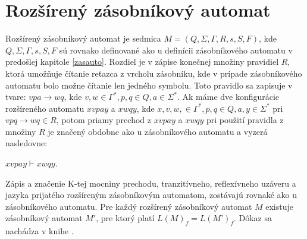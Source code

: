 \section{Rozšírený zásobníkový automat}
Rozšírený zásobníkový automat je sedmica $M = (Q, \Sigma, \Gamma, R, s, S, F)$, kde $Q, \Sigma, \Gamma, s, S, F$ sú rovnako definované ako u definícii zásobníkového automatu v predošlej kapitole \ref{zasauto}. Rozdiel je v zápise konečnej množiny pravidiel $R$, ktorá umožňuje čítanie reťazca z vrcholu zásobníku, kde v prípade zásobníkového automatu bolo možne čítanie len jedného symbolu. Toto pravidlo sa zapisuje v tvare: $vpa \to wq$, kde $v, w \in \Gamma^\ast, p, q \in Q, a \in \Sigma^\ast.$ Ak máme dve konfigurácie rozšíreného automatu $xvpay$ a $xwqy$, kde $ x, v, w, \in \Gamma^\ast, p, q \in Q, a, y \in \Sigma^\ast$ pri $vpq \to wq \in R$, potom priamy prechod z $xvpay$ a $xwqy$ pri použití pravidla z množiny $R$ je značený obdobne ako u zásobníkového automatu a vyzerá nasledovne: 
\begin{center}
$xvpay \vdash xwqy$.
\end{center}
Zápis a značenie K-tej mocniny prechodu, tranzitívneho, reflexívneho uzáveru a jazyka prijatého rozšíreným zásobníkovým automatom, zostávajú rovnaké ako u zásobníkového automatu. Pre každý rozšírený zásobníkový automat $M$ existuje zásobníkový automat $M'$, pre ktorý platí $L(M)_f = L(M’)_f$. Dôkaz sa nachádza v knihe \cite{Automata}. 


